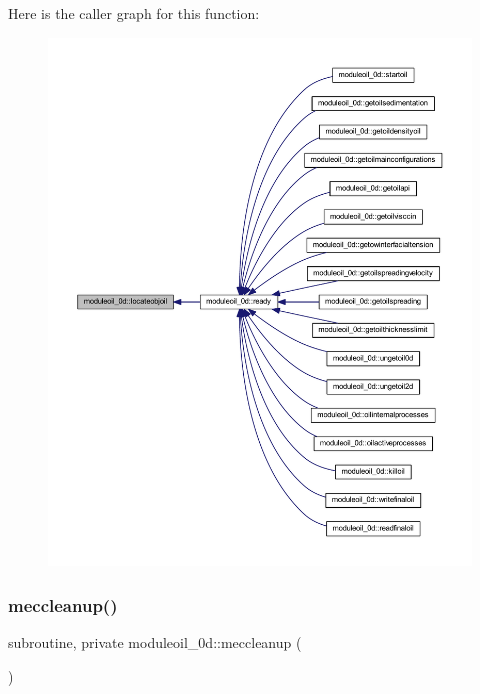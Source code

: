 Here is the caller graph for this function\+:\nopagebreak
\begin{figure}[H]
\begin{center}
\leavevmode
\includegraphics[width=350pt]{namespacemoduleoil__0d_a9c7229be13ce2cc83e0f461b6355f4fa_icgraph}
\end{center}
\end{figure}
\mbox{\label{namespacemoduleoil__0d_a44f803669a7c3e8a5a116008eb987343}} 
\subsubsection{\texorpdfstring{meccleanup()}{meccleanup()}}
{\footnotesize\ttfamily subroutine, private moduleoil\+\_\+0d\+::meccleanup (\begin{DoxyParamCaption}{ }\end{DoxyParamCaption})\hspace{0.3cm}{\ttfamily [private]}}

